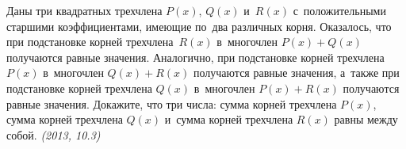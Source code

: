 \begin{problems}
\item
Даны три квадратных трехчлена $P(x)$, $Q(x)$ и~$R(x)$ с~положительными старшими
коэффициентами, имеющие по~два различных корня.
Оказалось, что при подстановке корней трехчлена~$R(x)$ в~многочлен
$P(x) + Q(x)$ получаются равные значения.
Аналогично, при подстановке корней трехчлена $P(x)$ в~многочлен $Q(x) + R(x)$
получаются равные значения, а~также при подстановке корней трехчлена $Q(x)$
в~многочлен $P(x) + R(x)$ получаются равные значения.
Докажите, что три числа:
сумма корней трехчлена $P(x)$, сумма корней трехчлена $Q(x)$ и~сумма
корней трехчлена $R(x)$ равны между собой.
\emph{(2013, 10.3)}

\end{problems}

%
%
%

